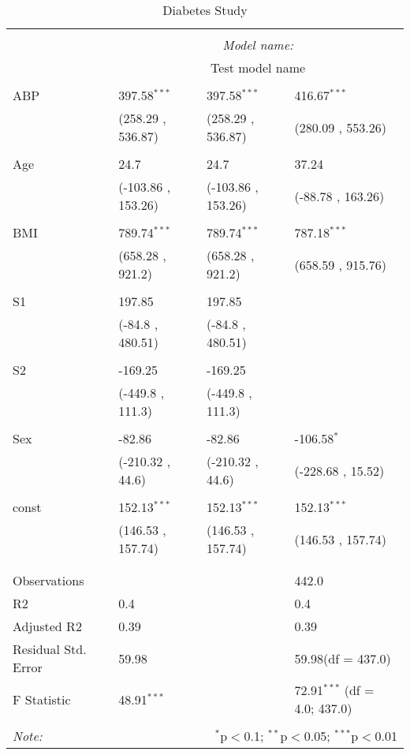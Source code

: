 \documentclass[12pt]{article}
\numberwithin{equation}{subsection}
\begin{document}
\begin{table}[!htbp] \centering
  \caption{Diabetes Study}
  \label{}
\begin{tabularx}{\textwidth}{lXXX}
\\[-1.8ex]\hline
\hline \\[-1.8ex]
& \multicolumn{3}{c}{\textit{Model name:}} \
\cr \cline{3-4}
\\[-1.8ex] & \multicolumn{3}{c}{Test model name} \\\hline \\[-1.8ex]
 ABP & 397.58$^{***}$ & 397.58$^{***}$ & 416.67$^{***}$ \\
  & (258.29 , 536.87) & (258.29 , 536.87) & (280.09 , 553.26) \\
  & & & \\
 Age & 24.7$^{}$ & 24.7$^{}$ & 37.24$^{}$ \\
  & (-103.86 , 153.26) & (-103.86 , 153.26) & (-88.78 , 163.26) \\
  & & & \\
 BMI & 789.74$^{***}$ & 789.74$^{***}$ & 787.18$^{***}$ \\
  & (658.28 , 921.2) & (658.28 , 921.2) & (658.59 , 915.76) \\
  & & & \\
 S1 & 197.85$^{}$ & 197.85$^{}$ & \\
  & (-84.8 , 480.51) & (-84.8 , 480.51) & \\
  & & & \\
 S2 & -169.25$^{}$ & -169.25$^{}$ & \\
  & (-449.8 , 111.3) & (-449.8 , 111.3) & \\
  & & & \\
 Sex & -82.86$^{}$ & -82.86$^{}$ & -106.58$^{*}$ \\
  & (-210.32 , 44.6) & (-210.32 , 44.6) & (-228.68 , 15.52) \\
  & & & \\
 const & 152.13$^{***}$ & 152.13$^{***}$ & 152.13$^{***}$ \\
  & (146.53 , 157.74) & (146.53 , 157.74) & (146.53 , 157.74) \\
  & & & \\
\hline \\[-1.8ex]
 Observations &   &   & 442.0 \\
 R${2}$ & 0.4 &   & 0.4 \\
 Adjusted R${2}$ & 0.39 &   & 0.39 \\
 Residual Std. Error & 59.98 &   & 59.98(df = 437.0)  \\
 F Statistic & 48.91$^{***}$  &     & 72.91$^{***}$ (df = 4.0; 437.0) \\
\hline
\hline \\[-1.8ex]
\textit{Note:} & \multicolumn{3}{r}{$^{*}$p$<$0.1; $^{**}$p$<$0.05; $^{***}$p$<$0.01} \\
\end{tabularx}
\end{table}
\end{document}
